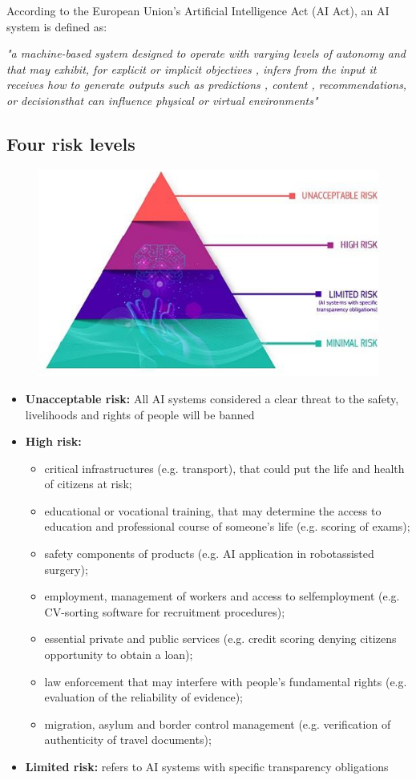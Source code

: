 \documentclass{report}
\begin{document}
According to the European Union's Artificial Intelligence Act (AI Act), an AI system is defined as: 
\begin{center}
    \textit{"a machine-based system designed to operate with varying levels of autonomy and that may exhibit, for explicit or implicit objectives , infers from the input it receives how to generate outputs such as predictions , content , recommendations, or decisionsthat can influence physical or virtual environments"}
\end{center}


\subsection{Four risk levels}
\begin{figure}[H]
    \centering
    \includegraphics[width=0.6\linewidth]{images/piramide.png}
\end{figure}

\begin{itemize}
    \item \textbf{Unacceptable risk:} All AI systems considered a clear threat to the safety, livelihoods and rights of people will be banned
    \item \textbf{High risk:} \begin{itemize}
        \item critical infrastructures (e.g. transport), that could put the life and health of citizens at risk;
        \item educational or vocational training, that may determine the access to education and professional course of someone’s life (e.g. scoring of exams);
        \item safety components of products (e.g. AI application in robotassisted surgery);
        \item employment, management of workers and access to selfemployment (e.g. CV-sorting software for recruitment procedures);
        \item essential private and public services (e.g. credit scoring denying citizens opportunity to obtain a loan);
        \item law enforcement that may interfere with people’s fundamental rights (e.g. evaluation of the reliability of evidence);
        \item migration, asylum and border control management (e.g. verification of authenticity of travel documents);
    \end{itemize}
    \item \textbf{Limited risk:} refers to AI systems with specific transparency obligations
\end{itemize}
\end{document}
